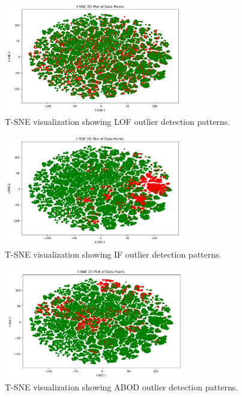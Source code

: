 \begin{figure}[htbp]
    \centering
    \includegraphics[width=0.7\textwidth]{plotsss/LOF.png} %
    \caption{T-SNE visualization showing LOF outlier detection patterns.}
    \label{fig:LOF}
\end{figure}
\begin{figure}[htbp]
    \centering
    \includegraphics[width=0.7\textwidth]{plotsss/ISF.png} %
    \caption{T-SNE visualization showing IF outlier detection patterns.}
    \label{fig:ISF}
\end{figure}
\begin{figure}[htbp]
    \centering
    \includegraphics[width=0.7\textwidth]{plotsss/ABOD.png} %
    \caption{T-SNE visualization showing ABOD outlier detection patterns.}
    \label{fig:ABOD}
\end{figure}
